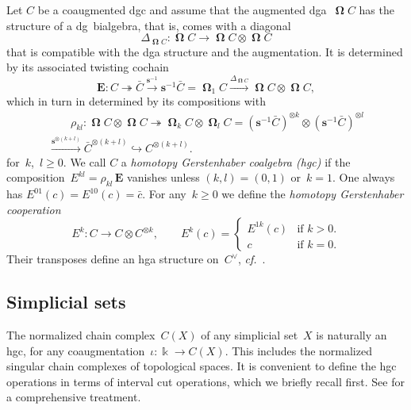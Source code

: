 \documentclass[letterpaper]{amsart}
\numberwithin{equation}{section}
\theoremstyle{plain}
\theoremstyle{definition}
\theoremstyle{remark}
\let\newterm\emph
\def\cf{\emph{cf.}}
\def\kk{\Bbbk}
\def\susp{\mathbf{s}}
\def\desusp{\susp^{-1}}
\def\EE{\mathbf{E}}
\DeclareMathOperator{\Cobar}{\mathbf{\Omega}}
\begin{document}
Let $C$ be a coaugmented dgc and assume that the augmented dga~$\Cobar C$ has the structure of a dg~bialgebra,
that is, comes with a diagonal
\begin{equation}
  \Delta_{\Cobar C}\colon \Cobar C \to \Cobar C\otimes\Cobar C
\end{equation}
that is compatible with the dga structure and the augmentation. It is determined by its associated twisting cochain
\begin{equation}
  \EE\colon C \twoheadrightarrow \bar C \xrightarrow{\desusp} \desusp\bar C = \Cobar_{1} C \xrightarrow{\Delta_{\Cobar C}} \Cobar C\otimes\Cobar C,
\end{equation}
which in turn in determined by its compositions with
\begin{multline}
  \qquad
  \rho_{kl}\colon \Cobar C\otimes\Cobar C \twoheadrightarrow \Cobar_{k} C\otimes\Cobar_{l} C = (\desusp\bar C)^{\otimes k} \otimes (\desusp\bar C)^{\otimes l} \\
  \xrightarrow{\susp^{\otimes(k+l)}} \bar C^{\otimes(k+l)} \hookrightarrow C^{\otimes(k+l)}.
  \qquad
\end{multline}
for~$k$,~$l\ge0$.
We call $C$ a \newterm{homotopy Gerstenhaber coalgebra (hgc)} if the composition~$E^{kl}=\rho_{kl}\,\EE$ vanishes unless $(k,l)=(0,1)$ or~$k=1$.
One always has $E^{01}(c)=E^{10}(c)=\bar c$.
For any~$k\ge0$ we define the \newterm{homotopy Gerstenhaber cooperation}
\begin{equation}
  E^{k}\colon C \to C\otimes C^{\otimes k},
  \qquad
  E^{k}(c) = \begin{cases}
    E^{1k}(c) & \text{if $k>0$.} \\
    c & \text{if $k=0$.}
  \end{cases}
\end{equation}
Their transposes define an hga structure on~$C^{\vee}$, \cf~\cite[Rem.~3.2]{Franz:szczarba2}.


\subsection{Simplicial sets}
\label{sec:simplicial}

The normalized chain complex~$C(X)$ of any simplicial set~$X$ is naturally an hgc,
for any coaugmentation~$\iota\colon\kk\to C(X)$. This includes the normalized
singular chain complexes of topological spaces. It is convenient to define
the hgc operations in terms of interval cut operations, which we briefly recall first.
See \cite[Secs.~1.2, 2.2]{BergerFresse:2004} for a comprehensive treatment.
\end{document}
